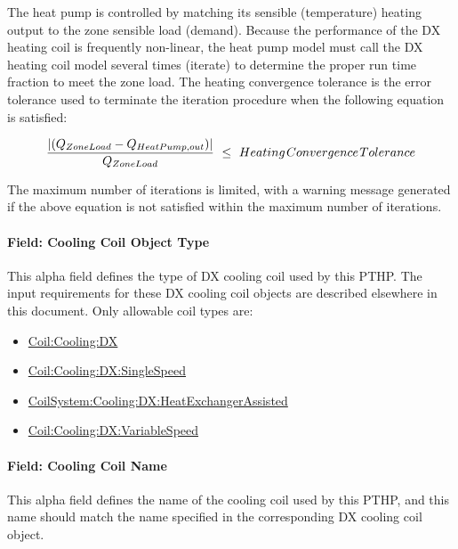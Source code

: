 The heat pump is controlled by matching its sensible (temperature) heating output to the zone sensible load (demand). Because the performance of the DX heating coil is frequently non-linear, the heat pump model must call the DX heating coil model several times (iterate) to determine the proper run time fraction to meet the zone load. The heating convergence tolerance is the error tolerance used to terminate the iteration procedure when the following equation is satisfied:

\begin{equation}
\frac{{\left| {({Q_{ZoneLoad}} - {Q_{HeatPump,out}})} \right|}}{{{Q_{ZoneLoad}}}}\,\, \le \,\,Heating{\kern 1pt} Convergence{\kern 1pt} Tolerance
\end{equation}

The maximum number of iterations is limited, with a warning message generated if the above equation is not satisfied within the maximum number of iterations.

\paragraph{Field: Cooling Coil Object Type}\label{field-cooling-coil-object-type-4-000}

This alpha field defines the type of DX cooling coil used by this PTHP. The input requirements for these DX cooling coil objects are described elsewhere in this document. Only allowable coil types are:

\begin{itemize}
\item
  \hyperref[coilcoolingdx]{Coil:Cooling:DX}
\item
  \hyperref[coilcoolingdxsinglespeed]{Coil:Cooling:DX:SingleSpeed}
\item
  \hyperref[coilsystemcoolingdxheatexchangerassisted]{CoilSystem:Cooling:DX:HeatExchangerAssisted}
\item
  \hyperref[coilcoolingdxvariablespeed]{Coil:Cooling:DX:VariableSpeed}
\end{itemize}

\paragraph{Field: Cooling Coil Name}\label{field-cooling-coil-name-3-000}

This alpha field defines the name of the cooling coil used by this PTHP, and this name should match the name specified in the corresponding DX cooling coil object.

